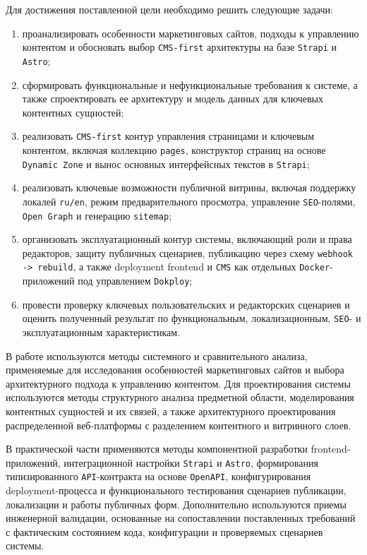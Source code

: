 Для достижения поставленной цели необходимо решить следующие задачи:
\begin{enumerate}
  \item проанализировать особенности маркетинговых сайтов, подходы к управлению
  контентом и обосновать выбор \texttt{CMS-first} архитектуры на базе \texttt{Strapi} и
  \texttt{Astro};
  \item сформировать функциональные и нефункциональные требования к системе, а также
  спроектировать ее архитектуру и модель данных для ключевых контентных сущностей;
  \item реализовать \texttt{CMS-first} контур управления страницами и ключевым контентом,
  включая коллекцию \texttt{pages}, конструктор страниц на основе \texttt{Dynamic Zone} и
  вынос основных интерфейсных текстов в \texttt{Strapi};
  \item реализовать ключевые возможности публичной витрины, включая поддержку локалей
  \texttt{ru/en}, режим предварительного просмотра, управление \texttt{SEO}-полями,
  \texttt{Open Graph} и генерацию \texttt{sitemap};
  \item организовать эксплуатационный контур системы, включающий роли и права редакторов,
  защиту публичных сценариев, публикацию через схему \texttt{webhook -> rebuild}, а также
  deployment frontend и \texttt{CMS} как отдельных \texttt{Docker}-приложений под
  управлением \texttt{Dokploy};
  \item провести проверку ключевых пользовательских и редакторских сценариев и оценить
  полученный результат по функциональным, локализационным, \texttt{SEO}- и
  эксплуатационным характеристикам.
\end{enumerate}


В работе используются методы системного и сравнительного анализа, применяемые для
исследования особенностей маркетинговых сайтов и выбора архитектурного подхода к
управлению контентом. Для проектирования системы используются методы структурного анализа
предметной области, моделирования контентных сущностей и их связей, а также
архитектурного проектирования распределенной веб-платформы с разделением контентного и
витринного слоев.

В практической части применяются методы компонентной разработки frontend-приложений,
интеграционной настройки \texttt{Strapi} и \texttt{Astro}, формирования типизированного
\texttt{API}-контракта на основе \texttt{OpenAPI}, конфигурирования deployment-процесса и
функционального тестирования сценариев публикации, локализации и работы публичных форм.
Дополнительно используются приемы инженерной валидации, основанные на сопоставлении
поставленных требований с фактическим состоянием кода, конфигурации и проверяемых
сценариев системы.

